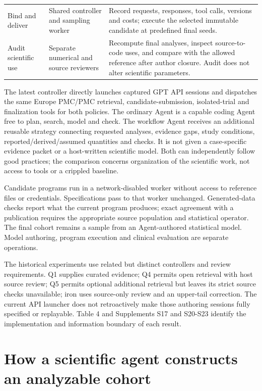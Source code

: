 \documentclass[11pt,letterpaper]{article}
\begin{document}
\begin{xltabular}{\linewidth}{@{}>{\raggedright\arraybackslash}X>{\raggedright\arraybackslash}X>{\raggedright\arraybackslash}X@{}}
Bind and deliver & Shared controller and sampling worker & Record requests, responses, tool calls, versions and costs; execute the selected immutable candidate at predefined final seeds. \\

Audit scientific use & Separate numerical and source reviewers & Recompute final analyses, inspect source-to-code uses, and compare with the allowed reference after author closure. Audit does not alter scientific parameters. \\

\end{xltabular}

\endgroup

The latest controller directly launches captured GPT API sessions and dispatches the same Europe PMC/\allowbreak{}PMC retrieval, candidate-submission, isolated-trial and finalization tools for both policies. The ordinary Agent is a capable coding Agent free to plan, search, model and check. The workflow Agent receives an additional reusable strategy connecting requested analyses, evidence gaps, study conditions, reported/\allowbreak{}derived/\allowbreak{}assumed quantities and checks. It is not given a case-specific evidence packet or a host-written scientific model. Both can independently follow good practices; the comparison concerns organization of the scientific work, not access to tools or a crippled baseline.


Candidate programs run in a network-disabled worker without access to reference files or credentials. Specifications pass to that worker unchanged. Generated-data checks report what the current program produces; exact agreement with a publication requires the appropriate source population and statistical operator. The final cohort remains a sample from an Agent-authored statistical model. Model authoring, program execution and clinical evaluation are separate operations.


The historical experiments use related but distinct controllers and review requirements. Q1 supplies curated evidence; Q4 permits open retrieval with host source review; Q5 permits optional additional retrieval but leaves its strict source checks unavailable; iron uses source-only review and an upper-tail correction. The current API launcher does not retroactively make those authoring sessions fully specified or replayable. Table 4 and Supplements S17 and S20-S23 identify the implementation and information boundary of each result.


\section{How a scientific agent constructs an analyzable cohort}
\end{document}
